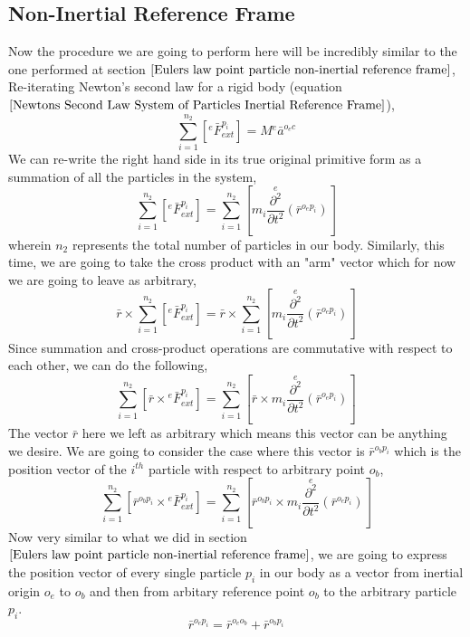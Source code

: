 \subsection{Non-Inertial Reference Frame}
\begin{comment}
\end{comment}
Now the procedure we are going to perform here will be incredibly similar to the one performed at section $\ref{Eulers law point particle non-inertial reference frame}$,
Re-iterating Newton's second law for a rigid body (equation $\ref{Newtons Second Law System of Particles Inertial Reference Frame}$),
$$\sum^{n_{2}}_{i = 1}\left[{}^{e}\bar{F}^{p_{i}}_{ext}\right] = M{}^{e}\bar{a}^{o_{e}c}$$
We can re-write the right hand side in its true original primitive form as a summation of all the particles in the system,
$$\sum^{n_{2}}_{i = 1}\left[{}^{e}\bar{F}^{p_{i}}_{ext}\right] = \sum^{n_{2}}_{i = 1}\left[m_{i}\overset{e}{\frac{\partial^{2}}{\partial t^{2}}}(\bar{r}^{o_{e}p_{i}})\right]$$
wherein $n_{2}$ represents the total number of particles in our body.
Similarly, this time, we are going to take the cross product with an "arm" vector which for now we are going to leave as arbitrary,
$$\bar{r}\times\sum^{n_{2}}_{i = 1}\left[{}^{e}\bar{F}^{p_{i}}_{ext}\right] = \bar{r}\times \sum^{n_{2}}_{i = 1}\left[m_{i}\overset{e}{\frac{\partial^{2}}{\partial t^{2}}}(\bar{r}^{o_{e}p_{i}})\right]$$
Since summation and cross-product operations are commutative with respect to each other, we can do the following,
$$\sum^{n_{2}}_{i = 1}\left[\bar{r}\times{}^{e}\bar{F}^{p_{i}}_{ext}\right] = \sum^{n_{2}}_{i = 1}\left[\bar{r}\times m_{i}\overset{e}{\frac{\partial^{2}}{\partial t^{2}}}(\bar{r}^{o_{e}p_{i}})\right]$$
The vector $\bar{r}$ here we left as arbitrary which means this vector can be anything we desire. 
We are going to consider the case where this vector is $\bar{r}^{o_{b}p_{i}}$ which is the position vector of the $i^{th}$ particle with respect to arbitrary point $o_{b}$,
$$\sum^{n_{2}}_{i = 1}\left[\bar{r}^{o_{b}p_{i}}\times{}^{e}\bar{F}^{p_{i}}_{ext}\right] = \sum^{n_{2}}_{i = 1}\left[\bar{r}^{o_{b}p_{i}}\times m_{i}\overset{e}{\frac{\partial^{2}}{\partial t^{2}}}(\bar{r}^{o_{e}p_{i}})\right]$$
Now very similar to what we did in section $\ref{Eulers law point particle non-inertial reference frame}$, we are going to express the position vector of every single particle $p_{i}$ in our body as a vector from inertial origin $o_{e}$ to $o_{b}$ and then from arbitary reference point $o_{b}$ to the arbitrary particle $p_{i}$.
$$\bar{r}^{o_{e}p_{i}} = \bar{r}^{o_{e}o_{b}} + \bar{r}^{o_{b}p_{i}}$$
